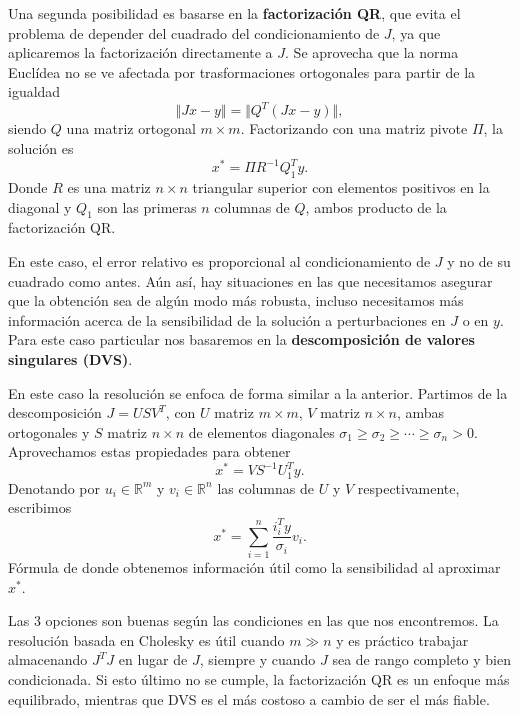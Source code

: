 \documentclass[11pt,a4paper]{book}
\theoremstyle{definition}
\theoremstyle{remark}
\begin{document}
Una segunda posibilidad es basarse en la \textbf{factorización QR}, que evita el problema de depender del cuadrado del condicionamiento de $J$, ya que aplicaremos la factorización directamente a $J$. Se aprovecha que la norma Euclídea no se ve afectada por trasformaciones ortogonales para partir de la igualdad
\begin{equation}
	\Vert Jx- y \Vert = \Vert Q^T(Jx-y) \Vert, 
\end{equation}
siendo $Q$ una matriz ortogonal $m \times m$. Factorizando con una matriz pivote $\Pi$, la solución es
\begin{equation}
	x^* = \Pi R^{-1}Q_1^Ty.
\end{equation}
Donde $R$ es una matriz $n \times n$ triangular superior con elementos positivos en la diagonal y $Q_1$ son las primeras $n$ columnas de $Q$, ambos producto de la factorización QR.

En este caso, el error relativo es proporcional al condicionamiento de $J$ y no de su cuadrado como antes. Aún así, hay situaciones en las que necesitamos asegurar que la obtención sea de algún modo más robusta, incluso necesitamos más información acerca de la sensibilidad de la solución a perturbaciones en $J$ o en $y$. Para este caso particular nos basaremos en la \textbf{descomposición de valores singulares (DVS)}.

En este caso la resolución se enfoca de forma similar a la anterior. Partimos de la descomposición $J = USV^T$, con $U$ matriz $m \times m$, $V$ matriz $n \times n$, ambas ortogonales y $S$ matriz $n \times n$ de elementos diagonales $\sigma_1 \geq \sigma_2 \geq \cdots \geq \sigma_n > 0$. Aprovechamos estas propiedades para obtener
\begin{equation}
	x^* = VS^{-1}U_1^Ty.
\end{equation}
Denotando por $u_i \in \mathbb{R}^m$ y $v_i \in \mathbb{R}^n$ las columnas de $U$ y $V$ respectivamente, escribimos
\begin{equation}
	x^* = \sum_{i=1}^n \frac{i_i^Ty}{\sigma_i}v_i.
\end{equation}
Fórmula de donde obtenemos información útil como la sensibilidad al aproximar $x^*$.

Las 3 opciones son buenas según las condiciones en las que nos encontremos. La resolución basada en Cholesky es útil cuando $m\gg n$ y es práctico trabajar almacenando $J^TJ$ en lugar de $J$, siempre y cuando $J$ sea de rango completo y bien condicionada. Si esto último no se cumple, la factorización QR es un enfoque más equilibrado, mientras que DVS es el más costoso a cambio de ser el más fiable.
\end{document}
